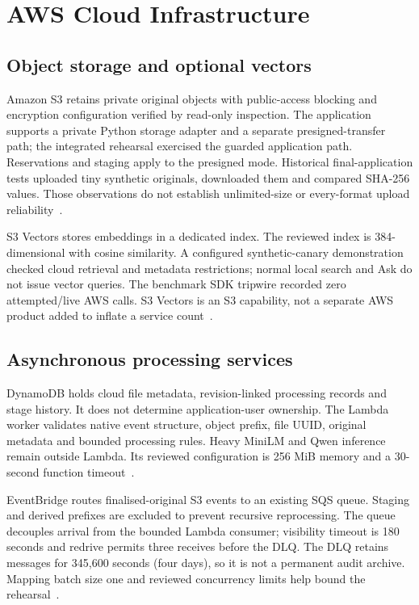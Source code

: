 \documentclass[11pt,a4paper,oneside]{report}
\begin{document}
\chapter{AWS Cloud Infrastructure}
\section{Object storage and optional vectors}
Amazon S3 retains private original objects with public-access blocking and encryption configuration verified by read-only inspection. The application supports a private Python storage adapter and a separate presigned-transfer path; the integrated rehearsal exercised the guarded application path. Reservations and staging apply to the presigned mode. Historical final-application tests uploaded tiny synthetic originals, downloaded them and compared SHA-256 values. Those observations do not establish unlimited-size or every-format upload reliability~\cite{s3}.

S3 Vectors stores embeddings in a dedicated index. The reviewed index is 384-dimensional with cosine similarity. A configured synthetic-canary demonstration checked cloud retrieval and metadata restrictions; normal local search and Ask do not issue vector queries. The benchmark SDK tripwire recorded zero attempted/live AWS calls. S3 Vectors is an S3 capability, not a separate AWS product added to inflate a service count~\cite{s3vectors}.
\section{Asynchronous processing services}
DynamoDB holds cloud file metadata, revision-linked processing records and stage history. It does not determine application-user ownership. The Lambda worker validates native event structure, object prefix, file UUID, original metadata and bounded processing rules. Heavy MiniLM and Qwen inference remain outside Lambda. Its reviewed configuration is 256 MiB memory and a 30-second function timeout~\cite{dynamodb,lambda}.

EventBridge routes finalised-original S3 events to an existing SQS queue. Staging and derived prefixes are excluded to prevent recursive reprocessing. The queue decouples arrival from the bounded Lambda consumer; visibility timeout is 180 seconds and redrive permits three receives before the DLQ. The DLQ retains messages for 345,600 seconds (four days), so it is not a permanent audit archive. Mapping batch size one and reviewed concurrency limits help bound the rehearsal~\cite{eventbridge,sqs}.
\end{document}
